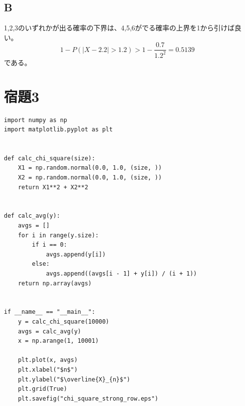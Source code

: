 \documentclass[10pt,a4paper]{ltjsarticle}       %
\begin{document}
\subsection{B}
1,2,3のいずれかが出る確率の下界は、4,5,6がでる確率の上界を1から引けば良い。
\begin{equation}
1-P(|X-2.2|>1.2) > 1-\frac{0.7}{1.2^2} = 0.5139
\end{equation}
である。
\section{宿題3}
\begin{lstlisting}
import numpy as np
import matplotlib.pyplot as plt


def calc_chi_square(size):
    X1 = np.random.normal(0.0, 1.0, (size, ))
    X2 = np.random.normal(0.0, 1.0, (size, ))
    return X1**2 + X2**2


def calc_avg(y):
    avgs = []
    for i in range(y.size):
        if i == 0:
            avgs.append(y[i])
        else:
            avgs.append((avgs[i - 1] + y[i]) / (i + 1))
    return np.array(avgs)


if __name__ == "__main__":
    y = calc_chi_square(10000)
    avgs = calc_avg(y)
    x = np.arange(1, 10001)

    plt.plot(x, avgs)
    plt.xlabel("$n$")
    plt.ylabel("$\overline{X}_{n}$")
    plt.grid(True)
    plt.savefig("chi_square_strong_row.eps")
\end{lstlisting}
\end{document}

